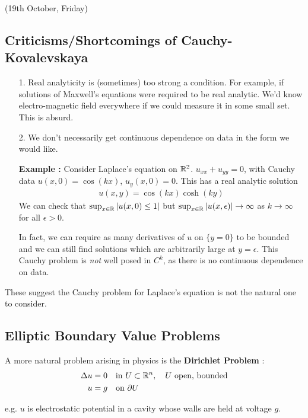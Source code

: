 \documentclass[10pt,a4paper]{report}
\begin{document}
\newday

(19th October, Friday)
\s

\subsection*{Criticisms/Shortcomings of Cauchy-Kovalevskaya}
\begin{itemize}
\item[1.] Real analyticity is (sometimes) too strong a condition. For example, if solutions of Maxwell's equations were required to be real analytic. We'd know electro-magnetic field everywhere if we could measure it in some small set. This is absurd.
\item[2.] We don't necessarily get continuous dependence on data in the form we would like.

\textbf{Example :} Consider Laplace's equation on $\mathbb{R}^2$. $u_{xx} + u_{yy} = 0$, with Cauchy data $u(x,0) = \cos (kx)$, $u_y(x,0) =0$. This has a real analytic solution
\begin{align*}
u(x,y) = \cos (kx) \cosh (ky)
\end{align*}
We can check that $\sup_{x\in \mathbb{R}} |u(x,0) \leq 1|$ but $\sup_{x\in \mathbb{R}} |u(x,\epsilon)| \rightarrow \infty$ as $k\rightarrow \infty$ for all $\epsilon >0$.

\quad In fact, we can require as many derivatives of $u$ on $\{ y=0 \}$ to be bounded and we can still find solutions which are arbitrarily large at $y=\epsilon$. This Cauchy problem is \emph{not} well posed in $C^k$, as there is no continuous dependence on data.
\s
\end{itemize}
\s

These suggest the Cauchy problem for Laplace's equation is not the natural one to consider. 

\subsection*{Elliptic Boundary Value Problems}

A more natural problem arising in physics is the \textbf{Dirichlet Problem} : 
\begin{align*}
\Delta u &= 0\quad \text{in } U\subset \mathbb{R}^n, \quad U \text{ open, bounded} \\
u &= g \quad \text{on } \partial U
\end{align*}

e.g. $u$ is electrostatic potential in a cavity whose walls are held at voltage $g$. 
\s
\end{document}
